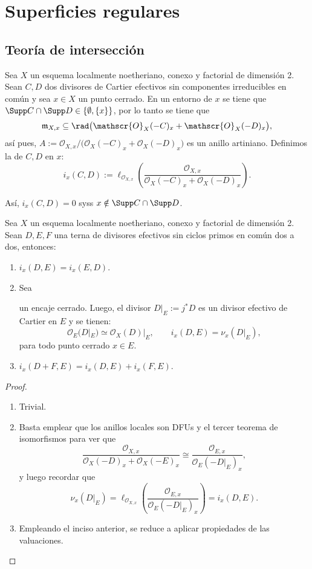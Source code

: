 \chapter{Superficies regulares}

\section{Teoría de intersección}
\begin{mydef}
	Sea $X$ un esquema localmente noetheriano, conexo y factorial de dimensión 2.
	Sean $C, D$ dos divisores de Cartier efectivos sin componentes irreducibles en común y sea $x \in X$ un punto cerrado.
	En un entorno de $x$ se tiene que $\Supp C \cap \Supp D \in \{ \emptyset, \{ x \} \}$, por lo tanto se tiene que
	$$ \mathfrak{m}_{X, x} \subseteq \rad\big( \mathscr{O}_X(-C)_x + \mathscr{O}_X(-D)_x \big), $$
	así pues, $A := \mathscr{O}_{X, x}/\big( \mathscr{O}_X(-C)_x + \mathscr{O}_X(-D)_x \big)$ es un anillo artiniano.
	Definimos la  de $C, D$ en $x$:
	$$ i_x(C, D) := \ell_{\mathscr{O}_{X, x}}\left( \frac{\mathscr{O}_{X, x}}{\mathscr{O}_X(-C)_x + \mathscr{O}_X(-D)_x} \right). $$
\end{mydef}
Así, $i_x(C, D) = 0$ syss $x \notin \Supp C \cap \Supp D$.

\begin{lem}
	Sea $X$ un esquema localmente noetheriano, conexo y factorial de dimensión 2.
	Sean $D, E, F$ una terna de divisores efectivos sin ciclos primos en común dos a dos, entonces:
	\begin{enumerate}
		\item $i_x(D, E) = i_x(E, D)$.
		\item Sea 
			un encaje cerrado.
			Luego, el divisor $D|_E := j^* D$ es un divisor efectivo de Cartier en $E$ y se tienen:
			$$ \mathscr{O}_E( D|_E ) \simeq \mathscr{O}_X(D)|_E, \qquad i_x(D, E) = \nu_x(D|_E), $$
			para todo punto cerrado $x \in E$.
		\item $i_x(D + F, E) = i_x(D, E) + i_x(F, E)$.
	\end{enumerate}
\end{lem}
\begin{proof}
	\begin{enumerate}
		\item Trivial.
		\item Basta emplear que los anillos locales son DFUs y el tercer teorema de isomorfismos para ver que
			$$ \frac{\mathscr{O}_{X, x}}{\mathscr{O}_X(-D)_x + \mathscr{O}_X(-E)_x} \cong \frac{\mathscr{O}_{E, x}}{\mathscr{O}_E(-D|_E)_x}, $$
			y luego recordar que
			$$ \nu_x(D|_E) = \ell_{\mathscr{O}_{X, x}}\left( \frac{\mathscr{O}_{E, x}}{\mathscr{O}_E(-D|_E)_x} \right) = i_x(D, E). $$
		\item Empleando el inciso anterior, se reduce a aplicar propiedades de las valuaciones. \qedhere
	\end{enumerate}
\end{proof}


